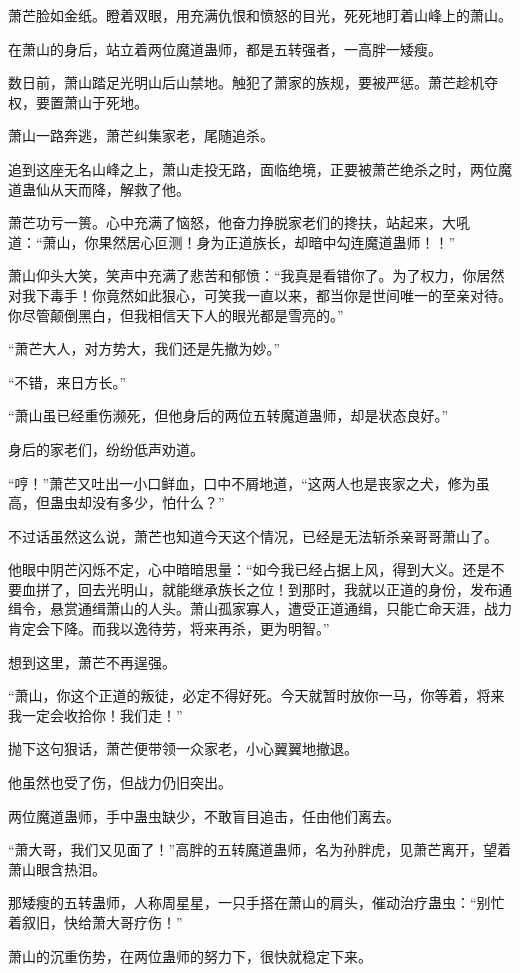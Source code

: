 \begin{this_body}
萧芒脸如金纸。瞪着双眼，用充满仇恨和愤怒的目光，死死地盯着山峰上的萧山。

在萧山的身后，站立着两位魔道蛊师，都是五转强者，一高胖一矮瘦。

数日前，萧山踏足光明山后山禁地。触犯了萧家的族规，要被严惩。萧芒趁机夺权，要置萧山于死地。

萧山一路奔逃，萧芒纠集家老，尾随追杀。

追到这座无名山峰之上，萧山走投无路，面临绝境，正要被萧芒绝杀之时，两位魔道蛊仙从天而降，解救了他。

萧芒功亏一篑。心中充满了恼怒，他奋力挣脱家老们的搀扶，站起来，大吼道：“萧山，你果然居心叵测！身为正道族长，却暗中勾连魔道蛊师！！”

萧山仰头大笑，笑声中充满了悲苦和郁愤：“我真是看错你了。为了权力，你居然对我下毒手！你竟然如此狠心，可笑我一直以来，都当你是世间唯一的至亲对待。你尽管颠倒黑白，但我相信天下人的眼光都是雪亮的。”

“萧芒大人，对方势大，我们还是先撤为妙。”

“不错，来日方长。”

“萧山虽已经重伤濒死，但他身后的两位五转魔道蛊师，却是状态良好。”

身后的家老们，纷纷低声劝道。

“哼！”萧芒又吐出一小口鲜血，口中不屑地道，“这两人也是丧家之犬，修为虽高，但蛊虫却没有多少，怕什么？”

不过话虽然这么说，萧芒也知道今天这个情况，已经是无法斩杀亲哥哥萧山了。

他眼中阴芒闪烁不定，心中暗暗思量：“如今我已经占据上风，得到大义。还是不要血拼了，回去光明山，就能继承族长之位！到那时，我就以正道的身份，发布通缉令，悬赏通缉萧山的人头。萧山孤家寡人，遭受正道通缉，只能亡命天涯，战力肯定会下降。而我以逸待劳，将来再杀，更为明智。”

想到这里，萧芒不再逞强。

“萧山，你这个正道的叛徒，必定不得好死。今天就暂时放你一马，你等着，将来我一定会收拾你！我们走！”

抛下这句狠话，萧芒便带领一众家老，小心翼翼地撤退。

他虽然也受了伤，但战力仍旧突出。

两位魔道蛊师，手中蛊虫缺少，不敢盲目追击，任由他们离去。

“萧大哥，我们又见面了！”高胖的五转魔道蛊师，名为孙胖虎，见萧芒离开，望着萧山眼含热泪。

那矮瘦的五转蛊师，人称周星星，一只手搭在萧山的肩头，催动治疗蛊虫：“别忙着叙旧，快给萧大哥疗伤！”

萧山的沉重伤势，在两位蛊师的努力下，很快就稳定下来。


\end{this_body}
